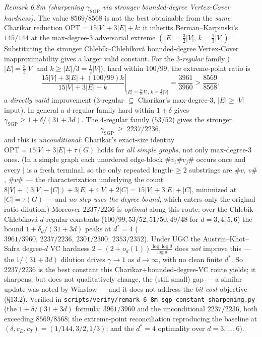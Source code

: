 \documentclass[
]{article}
\begin{document}
\emph{Remark 6.8m (sharpening $\gamma_{\mathrm{SGP}}$ via stronger bounded-degree Vertex-Cover
hardness).} The value $8569/8568$ is not the best obtainable from the \emph{same} Charikar
reduction $\mathrm{OPT}=15|V|+3|E|+k$: it inherits Berman--Karpinski's $145/144$ at the
max-degree-3 adversarial extreme $(|E|=\tfrac32|V|,\,k=\tfrac13|V|)$. Substituting the stronger
Chleb\'ik--Chleb\'ikov\'a bounded-degree Vertex-Cover inapproximability gives a larger valid
constant. For the \emph{$3$-regular} family ($|E|=\tfrac32|V|$ and $k\ge|E|/3=\tfrac12|V|$),
hard within $100/99$, the extreme-point ratio is
\[
\left.\frac{15|V|+3|E|+(100/99)k}{15|V|+3|E|+k}\right|_{|E|=\frac32|V|,\,k=\frac12|V|}
=\frac{3961}{3960}>\frac{8569}{8568},
\]
a \emph{directly valid} improvement ($3$-regular $\subseteq$ Charikar's max-degree-3,
$|E|\ge|V|$ input). In general a $d$-regular family hard within $1+\delta$ gives
$\gamma_{\mathrm{SGP}}\ge 1+\delta/(31+3d)$. The $4$-regular family ($53/52$) gives the stronger
\[
  \gamma_{\mathrm{SGP}}\ \ge\ 2237/2236,
\]
and this is \emph{unconditional}: Charikar's exact-size identity $\mathrm{OPT}=15|V|+3|E|+\tau(G)$
holds for \emph{all simple graphs}, not only max-degree-3 ones. (In a simple graph each unordered
edge-block $\#v_i\#v_j\#$ occurs once and every $|$ is a fresh terminal, so the only repeated
length-$\ge2$ substrings are $\#v$, $v\#$, $\#v\#$ --- the characterization underlying the count
$8|V|+(3|V|-|C|)+3|E|+4|V|+2|C|=15|V|+3|E|+|C|$, minimized at $|C|=\tau(G)$ --- and \emph{no step
uses the degree bound}, which enters only the original ratio-dilution.) Moreover $2237/2236$ is
\emph{optimal} along this route: over the Chleb\'ik--Chleb\'ikov\'a $d$-regular constants
($100/99,53/52,51/50,49/48$ for $d=3,4,5,6$) the bound $1+\delta_d/(31+3d)$ peaks at $d^\ast=4$
($3961/3960,\,2237/2236,\,2301/2300,\,2353/2352$). Under UGC the Austrin--Khot--Safra degree-$d$
VC hardness $2-(2+o_d(1))\tfrac{\log\log d}{\log d}$ does \emph{not} improve this --- the
$1/(31+3d)$ dilution drives $\gamma\to1$ as $d\to\infty$, with no clean finite $d^\ast$. So
$2237/2236$ is the best constant this Charikar$+$bounded-degree-VC route yields; it sharpens, but
does not qualitatively change, the (still small) gap --- a similar update was noted by Winslow ---
and it does not address the \emph{bit-cost} objective (§13.2). Verified in
\texttt{scripts/verify/remark\_6\_8m\_sgp\_constant\_sharpening.py} (the $1+\delta/(31+3d)$
formula; $3961/3960$ and the unconditional $2237/2236$, both exceeding $8569/8568$; the
extreme-point reconciliation reproducing the baseline at $(\delta,c_E,c_T)=(1/144,3/2,1/3)$; and
the $d^\ast=4$ optimality over $d=3,\dots,6$).
\end{document}
